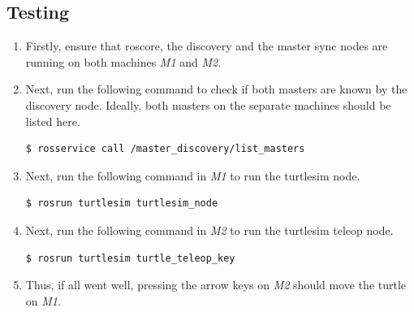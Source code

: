 \documentclass[11pt]{article}
\begin{document}
\subsection{Testing}
\begin{enumerate}
 \item {
       Firstly, ensure that roscore, the discovery and the master sync nodes are running on both machines \emph{M1} and \emph{M2}.
       }
 \item{
       Next, run the following command to check if both masters are known by the discovery node.
       Ideally, both masters on the separate machines should be listed here.
       \begin{lstlisting}[language=bash]
         $ rosservice call /master_discovery/list_masters
        \end{lstlisting}
       }
 \item{
       Next, run the following command in \emph{M1} to run the turtlesim node.
       \begin{lstlisting}[language=bash]
          $ rosrun turtlesim turtlesim_node
        \end{lstlisting}
       }
 \item{
       Next, run the following command in \emph{M2} to run the turtlesim teleop node.
       \begin{lstlisting}[language=bash]
          $ rosrun turtlesim turtle_teleop_key
        \end{lstlisting}
       }
 \item{
       Thus, if all went well, pressing the arrow keys on \emph{M2} should move the turtle on \emph{M1}.
       }
\end{enumerate}
\end{document}
